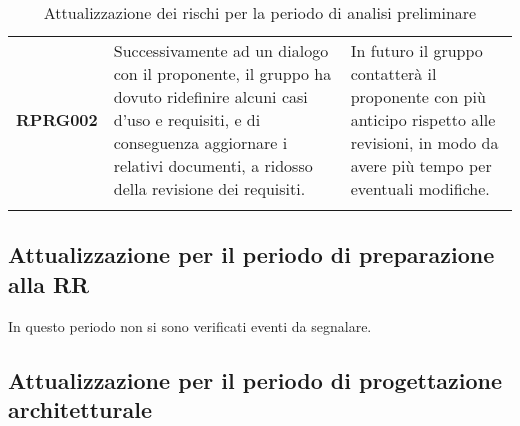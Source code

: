 \documentclass[../piano-di-progetto]{subfiles}
\begin{document}
\begin{longtable}[H]{|p{10em}|p{17em}|p{17em}|}
  \textbf{RPRG002}                                    & Successivamente ad un dialogo con il proponente, il gruppo ha dovuto ridefinire alcuni casi d'uso e requisiti, e di conseguenza aggiornare i relativi documenti, a ridosso della revisione dei requisiti.     & In futuro il gruppo contatterà il proponente con più anticipo rispetto alle revisioni, in modo da avere più tempo per eventuali modifiche.                                      \\
  \rowcolor{white}
  \caption{Attualizzazione dei rischi per la periodo di analisi preliminare}%
  \label{tab:attualizzazione_periodo_analisi_preliminare}
\end{longtable}


\subsection{Attualizzazione per il periodo di preparazione alla RR}%
\label{sub:attualizzazione_periodo_prep_RR}
In questo periodo non si sono verificati eventi da segnalare.

\subsection{Attualizzazione per il periodo di progettazione architetturale}%
\label{sub:attualizzazione_per_la_periodo_di_progettazione_architetturale}
\end{document}
